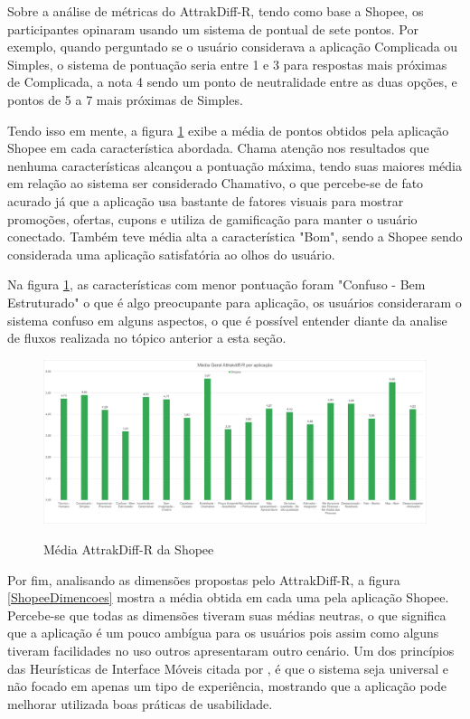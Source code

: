 Sobre a análise de métricas do AttrakDiff-R, tendo como base a Shopee, os participantes opinaram usando um sistema de pontual de sete pontos. Por exemplo, quando perguntado se o usuário considerava a aplicação Complicada ou Simples, o sistema de pontuação seria entre 1 e 3 para respostas mais próximas de Complicada, a nota 4 sendo um ponto de neutralidade entre as duas opções, e pontos de 5 a 7 mais próximas de Simples.

Tendo isso em mente, a figura \ref{MediaAtrrakShopee} exibe a média de pontos obtidos pela aplicação Shopee em cada característica abordada. Chama atenção nos resultados que nenhuma características alcançou a pontuação máxima, tendo suas maiores média em relação ao sistema ser considerado Chamativo, o que percebe-se de fato acurado já que a aplicação usa bastante de fatores visuais para mostrar promoções, ofertas, cupons e utiliza de gamificação para manter o usuário conectado. Também teve média alta a característica "Bom", sendo a Shopee sendo considerada uma aplicação satisfatória ao olhos do usuário.

Na figura \ref{MediaAtrrakShopee}, as características com menor pontuação foram "Confuso - Bem Estruturado" o que é algo preocupante para aplicação, os usuários consideraram o sistema confuso em alguns aspectos, o que é possível entender diante da analise de fluxos realizada no tópico anterior a esta seção.

\begin{figure}[ht]
    \centering
    \caption{Média AttrakDiff-R da Shopee}
    \includegraphics[keepaspectratio=true,scale=0.3]{figuras/Media_Aplicacao_Shopee_eixoY.png}
    \label{MediaAtrrakShopee}
\end{figure}

Por fim, analisando as dimensões propostas pelo AttrakDiff-R, a figura \ref{ShopeeDimencoes} mostra a média obtida em cada uma pela aplicação Shopee. Percebe-se que todas as dimensões tiveram suas médias neutras, o que significa que a aplicação é um pouco ambígua para os usuários pois assim como alguns tiveram facilidades no uso outros apresentaram outro cenário. Um dos princípios das Heurísticas de Interface Móveis citada por , é que o sistema seja universal e não focado em apenas um tipo de experiência, mostrando que a aplicação pode melhorar utilizada boas práticas de usabilidade.


